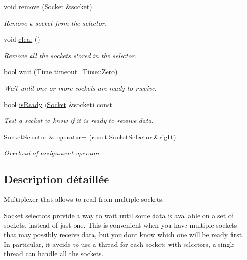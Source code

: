 \begin{DoxyCompactItemize}
void \hyperlink{classsf_1_1SocketSelector_a98b6ab693a65b82caa375639232357c1}{remove} (\hyperlink{classsf_1_1Socket}{Socket} \&socket)
\begin{DoxyCompactList}\small\item\em Remove a socket from the selector. \end{DoxyCompactList}\item 
void \hyperlink{classsf_1_1SocketSelector_a76e650acb0199d4be91e90a493fbc91a}{clear} ()
\begin{DoxyCompactList}\small\item\em Remove all the sockets stored in the selector. \end{DoxyCompactList}\item 
bool \hyperlink{classsf_1_1SocketSelector_a9cfda5475f17925e65889394d70af702}{wait} (\hyperlink{classsf_1_1Time}{Time} timeout=\hyperlink{classsf_1_1Time_a8db127b632fa8da21550e7282af11fa0}{Time\+::\+Zero})
\begin{DoxyCompactList}\small\item\em Wait until one or more sockets are ready to receive. \end{DoxyCompactList}\item 
bool \hyperlink{classsf_1_1SocketSelector_a917a4bac708290a6782e6686fd3bf889}{is\+Ready} (\hyperlink{classsf_1_1Socket}{Socket} \&socket) const
\begin{DoxyCompactList}\small\item\em Test a socket to know if it is ready to receive data. \end{DoxyCompactList}\item 
\hyperlink{classsf_1_1SocketSelector}{Socket\+Selector} \& \hyperlink{classsf_1_1SocketSelector_ae6395c7a8d29a9ea14939cc5d1ba3a33}{operator=} (const \hyperlink{classsf_1_1SocketSelector}{Socket\+Selector} \&right)
\begin{DoxyCompactList}\small\item\em Overload of assignment operator. \end{DoxyCompactList}\end{DoxyCompactItemize}


\subsection{Description détaillée}
Multiplexer that allows to read from multiple sockets. 

\hyperlink{classsf_1_1Socket}{Socket} selectors provide a way to wait until some data is available on a set of sockets, instead of just one. This is convenient when you have multiple sockets that may possibly receive data, but you don\textquotesingle{}t know which one will be ready first. In particular, it avoids to use a thread for each socket; with selectors, a single thread can handle all the sockets.

